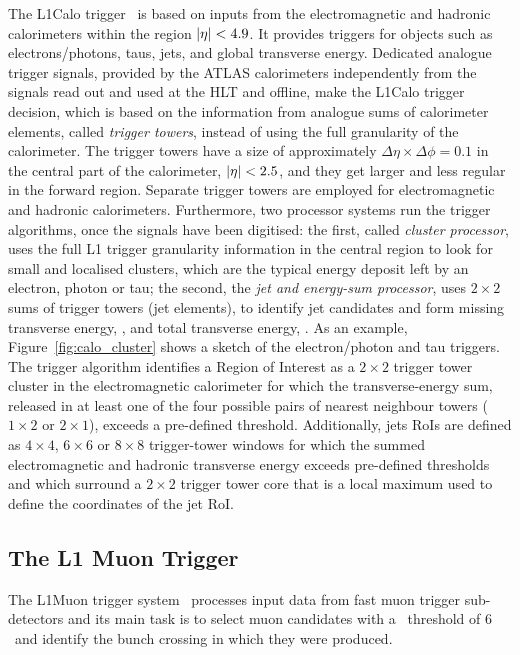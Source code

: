 			The \ac{L1Calo} trigger~\cite{ATLASJINST, ATLASL1CaloTrig} is based on inputs from the electromagnetic and hadronic calorimeters within the region $|\eta|<4.9$. It provides triggers for objects such as electrons/photons, taus, jets, and global transverse energy. Dedicated analogue trigger signals, provided by the \ac{ATLAS} calorimeters independently from the signals read out and used at the \ac{HLT} and offline, make the \ac{L1Calo} trigger decision, which is based on the information from analogue sums of calorimeter elements, called \emph{trigger towers}, instead of using the full granularity of the calorimeter. The trigger towers have a size of approximately $\Delta \eta \times \Delta \phi = 0.1$ in the central part of the calorimeter, $|\eta| < 2.5$, and they get larger and less regular in the forward region. Separate trigger towers are employed for electromagnetic and hadronic calorimeters. Furthermore, two processor systems run the trigger algorithms, once the signals have been digitised: the first, called \emph{cluster processor}, uses the full \ac{L1} trigger granularity information in the central region to look for small and localised clusters, which are the typical energy deposit left by an electron, photon or tau; the second, the \emph{jet and energy-sum processor}, uses $2 \times 2$ sums of trigger towers (jet elements), to identify jet candidates and form missing transverse energy, \met, and total transverse energy, \et. As an example, Figure~\ref{fig:calo_cluster} shows a sketch of the electron/photon and tau triggers. The trigger algorithm identifies a Region of Interest as a $2 \times 2$ trigger tower cluster in the electromagnetic calorimeter for which the transverse-energy sum, released in at least one of the four possible pairs of nearest neighbour towers ($1 \times 2$ or $2 \times 1$), exceeds a pre-defined threshold. Additionally, jets \ac{RoI}s are defined as $4 \times 4$, $6 \times 6$ or $8 \times 8$ trigger-tower windows for which the summed electromagnetic and hadronic transverse energy exceeds pre-defined thresholds and which surround a $2 \times 2$ trigger tower core that is a local maximum used to define the coordinates of the jet \ac{RoI}.


		\subsection*{The L1 Muon Trigger}

			The \ac{L1Muon} trigger system~\cite{ATLASPerf08} processes input data from fast muon trigger sub-detectors and its main task is to select muon candidates with a \pt\ threshold of 6 \GeV\ and identify the bunch crossing in which they were produced.

